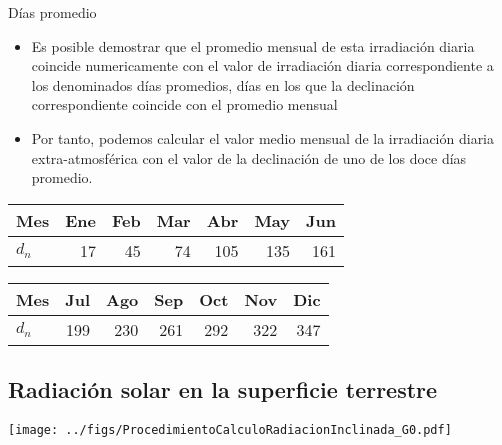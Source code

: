 \documentclass[xcolor={usenames,svgnames,dvipsnames}]{beamer}
\begin{document}
\begin{frame}[label={sec:org1747e18}]{Días promedio}
\begin{itemize}
\item Es posible demostrar que el \alert{promedio mensual} de esta irradiación
diaria \alert{coincide numericamente} con el valor de irradiación diaria
correspondiente a los denominados \alert{días promedios}, días en los que
la declinación correspondiente coincide con el promedio mensual

\item Por tanto, podemos calcular el valor medio mensual de la irradiación
diaria extra-atmosférica con el valor de la declinación de uno de los
doce días promedio.
\end{itemize}

\begin{center}
\begin{tabular}{lrrrrrr}
Mes & Ene & Feb & Mar & Abr & May & Jun\\
\hline
\(d_n\) & 17 & 45 & 74 & 105 & 135 & 161\\
\end{tabular}
\end{center}

\begin{center}
\begin{tabular}{lrrrrrr}
Mes & Jul & Ago & Sep & Oct & Nov & Dic\\
\hline
\(d_n\) & 199 & 230 & 261 & 292 & 322 & 347\\
\end{tabular}
\end{center}
\end{frame}

\subsection{Radiación solar en la superficie terrestre}
\label{sec:org8d3a0b0}
\begin{frame}[label={sec:orgf1b0930}]{}
\begin{center}
\texttt{[image: ../figs/ProcedimientoCalculoRadiacionInclinada\_G0.pdf]}
\end{center}
\end{frame}
\end{document}
